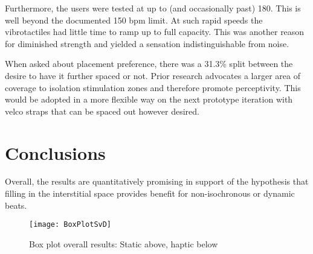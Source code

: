 Furthermore, the users were tested at up to (and occasionally past) 180. This is well beyond the documented 150 bpm limit. At such rapid speeds the vibrotactiles had little time to ramp up to full capacity. This was another reason for diminished strength and yielded a sensation indistinguishable from noise.

When asked about placement preference, there was a 31.3\% split between the desire to have it further spaced or not. Prior research advocates a larger area of coverage to isolation stimulation zones and therefore promote perceptivity. This would be adopted in a more flexible way on the next prototype iteration with velco straps that can be spaced out however desired.

\section{Conclusions}
Overall, the results are quantitatively promising in support of the hypothesis that filling in the interstitial space provides benefit for non-isochronous or dynamic beats.

\begin{figure} \label{fig:BoxPlotSvD}
    \centering
    \texttt{[image: BoxPlotSvD]}
    \caption{Box plot overall results: Static above, haptic below}
\end{figure}